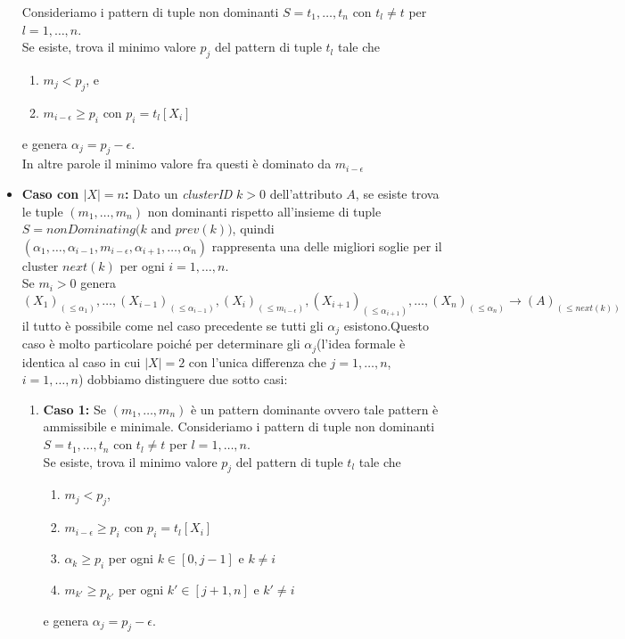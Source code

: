\begin{itemize}
		Consideriamo i pattern di tuple non dominanti $S=t_{1},\dots,t_{n}$ con $t_{l}\neq t$ per $l=1,\dots,n$.\\
		Se esiste, trova il minimo valore $p_{j}$ del pattern di tuple $t_{l}$ tale che
			\begin{enumerate}
				\item  $m_{j}<p_{j}$, e
				\item $m_{i-\epsilon} \geq p_{i}$ con $p_{i}=t_{l}[X_{i}]$
			\end{enumerate}  
		e genera $\alpha_{j}= p_{j} -\epsilon$.\\ In altre parole il minimo valore fra questi è dominato da $m_{i-\epsilon}$
		\item 
			\textbf{Caso con $|X|=n$:} Dato un \textit{clusterID} $k>0$ dell'attributo $A$, se esiste trova le tuple $(m_{1},\dots,m_{n})$ non dominanti rispetto all'insieme di tuple \\$S=nonDominating(k$ and $prev(k))$, quindi $(\alpha_{1},\dots,\alpha_{i-1},m_{i-\epsilon},\alpha_{i+1},\dots,\alpha_{n})$ rappresenta una delle migliori soglie per il cluster $next(k)$ per ogni $i=1,\dots,n$.  \\
			Se $m_{i} >0$ genera
			\begin{equation*}
				(X_{1})_{(\leq \alpha_{1})},\dots,(X_{i-1})_{(\leq \alpha_{i-1})},(X_{i})_{(\leq m_{i-\epsilon})},(X_{i+1})_{(\leq \alpha_{i+1})},\dots,(X_{n})_{(\leq \alpha_{n})} \rightarrow (A)_{(\leq next(k))}
			\end{equation*}
			il tutto è possibile come nel caso precedente se tutti gli $\alpha_{j}$ esistono.Questo caso è molto particolare poiché per determinare gli $\alpha_{j}$(l'idea formale è identica al caso in cui  $|X|=2$ con l'unica differenza che $j=1,\dots,n$, $i=1,\dots,n$) dobbiamo distinguere due sotto casi:
				\begin{enumerate}
				\item  \textbf{Caso 1:} Se $(m_{1},\dots,m_{n})$ è un pattern dominante ovvero tale pattern è ammissibile e minimale.
					Consideriamo i pattern di tuple non dominanti $S=t_{1},\dots,t_{n}$ con $t_{l}\neq t$ per $l=1,\dots,n$.\\
				Se esiste, trova il minimo valore $p_{j}$ del pattern di tuple $t_{l}$ tale che
				\begin{enumerate}
					\item  $m_{j}<p_{j}$, 
					\item $m_{i-\epsilon} \geq p_{i}$ con $p_{i}=t_{l}[X_{i}]$
					\item $\alpha_{k} \geq p_{i}$ per ogni $k \in [0,j-1]$ e $k \neq i$
					\item $m_{k'} \geq p_{k'}$ per ogni $k' \in [j+1,n]$ e $k' \neq i$
				\end{enumerate}  
				e genera $\alpha_{j}= p_{j} -\epsilon$.\\
				 

\end{enumerate}
\end{itemize}
